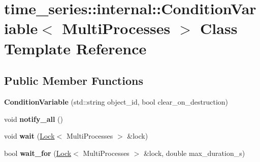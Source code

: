 \hypertarget{classtime__series_1_1internal_1_1ConditionVariable_3_01MultiProcesses_01_4}{}\section{time\+\_\+series\+:\+:internal\+:\+:Condition\+Variable$<$ Multi\+Processes $>$ Class Template Reference}
\label{classtime__series_1_1internal_1_1ConditionVariable_3_01MultiProcesses_01_4}
\subsection*{Public Member Functions}
\begin{DoxyCompactItemize}
\item 
{\bfseries Condition\+Variable} (std\+::string object\+\_\+id, bool clear\+\_\+on\+\_\+destruction)\hypertarget{classtime__series_1_1internal_1_1ConditionVariable_3_01MultiProcesses_01_4_aa10f91dd8c06860ea4f0ce68cb6b79a3}{}\label{classtime__series_1_1internal_1_1ConditionVariable_3_01MultiProcesses_01_4_aa10f91dd8c06860ea4f0ce68cb6b79a3}

\item 
void {\bfseries notify\+\_\+all} ()\hypertarget{classtime__series_1_1internal_1_1ConditionVariable_3_01MultiProcesses_01_4_a20d252072246eda6342c31c9e2cd64ff}{}\label{classtime__series_1_1internal_1_1ConditionVariable_3_01MultiProcesses_01_4_a20d252072246eda6342c31c9e2cd64ff}

\item 
void {\bfseries wait} (\hyperlink{classtime__series_1_1internal_1_1Lock}{Lock}$<$ Multi\+Processes $>$ \&lock)\hypertarget{classtime__series_1_1internal_1_1ConditionVariable_3_01MultiProcesses_01_4_a0cf6775e3a5c53abc17cfd69ed303d75}{}\label{classtime__series_1_1internal_1_1ConditionVariable_3_01MultiProcesses_01_4_a0cf6775e3a5c53abc17cfd69ed303d75}

\item 
bool {\bfseries wait\+\_\+for} (\hyperlink{classtime__series_1_1internal_1_1Lock}{Lock}$<$ Multi\+Processes $>$ \&lock, double max\+\_\+duration\+\_\+s)\hypertarget{classtime__series_1_1internal_1_1ConditionVariable_3_01MultiProcesses_01_4_a3edc647b93bf392aa0bdbec1c2a94762}{}\label{classtime__series_1_1internal_1_1ConditionVariable_3_01MultiProcesses_01_4_a3edc647b93bf392aa0bdbec1c2a94762}

\end{DoxyCompactItemize}
